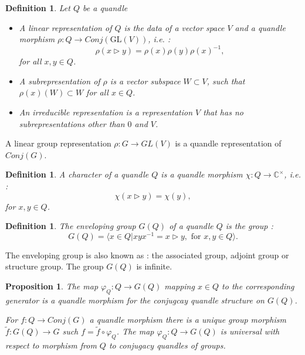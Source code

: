 \documentclass[12pt, reqno]{amsart}
\newtheorem{proposition}[theorem]{Proposition}
\newtheorem{definition}[theorem]{Definition}
\begin{document}
\begin{definition}{\cite{rep}}Let $Q$ be a quandle
\begin{itemize}
\item[1)] A linear representation of $Q$ is the data of a vector space $V$ and a quandle morphism $\rho: Q \to Conj(\mathrm{GL}(V))$, i.e. : 
$$\rho(x\triangleright y)=\rho(x) \rho(y) \rho(x)^{-1},$$
for all $x,y \in Q$.
\item[2)] A subrepresentation of $\rho$ is a vector subspace $W\subset V$, such that $\rho(x)(W) \subset W$ for all $x\in Q$.
\item[3)] An irreducible representation is a representation $V$ that has no subrepresentations other than $0$ and $V$.
\end{itemize}
\end{definition} 
A linear group representation $\rho : G \to GL(V)$ is a quandle representation of $Conj(G)$.
\begin{definition}{\cite{Qrep}}
A character of a quandle $Q$ is a quandle morphism $\chi : Q \to \mathbb{C}^\times$, i.e. :$$\chi(x\triangleright y) =\chi(y),$$ for $x,y\in Q$.
\end{definition}
\begin{definition}
The enveloping group $G(Q)$ of a quandle $Q$ is the group :
$$G(Q)=\langle x \in Q \vert xyx^{-1}=x\triangleright y , \text{ for } x,y\in Q\rangle.$$
\end{definition}
The enveloping group is also known as : the associated group, adjoint group or structure group. The group $G(Q)$ is infinite.
\begin{proposition}
 
\item[1)] The map $\varphi_Q : Q \to G(Q)$ mapping $x\in Q$ to the corresponding generator is a quandle morphism for the conjugcay quandle structure on $G(Q)$.
\item[2)]For $f:Q\to Conj(G)$ a quandle morphism there is a unique group morphism $\tilde{f}:G(Q)\to G$ such $f=\tilde{f}\circ\varphi_Q$. The map $\varphi_Q: Q \to G(Q)$ is universal with respect to morphism from $Q$ to conjugacy quandles of groups.
 
\end{proposition}
\end{document}
